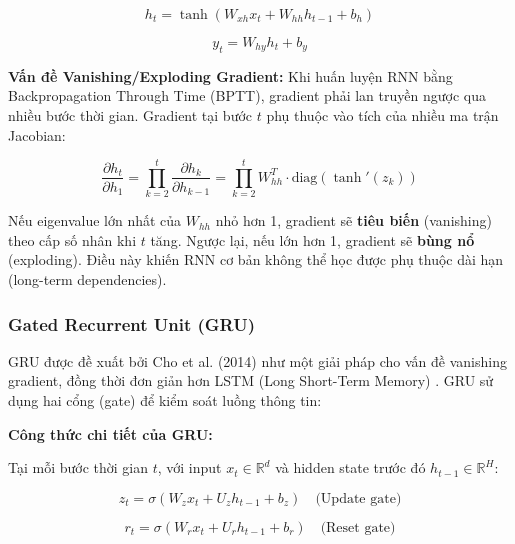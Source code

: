 \documentclass[12pt, a4paper]{article}
\begin{document}
\begin{equation}
    h_t = \tanh(W_{xh} x_t + W_{hh} h_{t-1} + b_h)
    \label{eq:rnn_basic}
\end{equation}

\begin{equation}
    y_t = W_{hy} h_t + b_y
    \label{eq:rnn_output}
\end{equation}

\textbf{Vấn đề Vanishing/Exploding Gradient:} Khi huấn luyện RNN bằng Backpropagation Through Time (BPTT), gradient phải lan truyền ngược qua nhiều bước thời gian. Gradient tại bước $t$ phụ thuộc vào tích của nhiều ma trận Jacobian:

\begin{equation}
    \frac{\partial h_t}{\partial h_1} = \prod_{k=2}^{t} \frac{\partial h_k}{\partial h_{k-1}} = \prod_{k=2}^{t} W_{hh}^T \cdot \text{diag}(\tanh'(z_k))
    \label{eq:vanishing}
\end{equation}

Nếu eigenvalue lớn nhất của $W_{hh}$ nhỏ hơn 1, gradient sẽ \textbf{tiêu biến} (vanishing) theo cấp số nhân khi $t$ tăng. Ngược lại, nếu lớn hơn 1, gradient sẽ \textbf{bùng nổ} (exploding). Điều này khiến RNN cơ bản không thể học được phụ thuộc dài hạn (long-term dependencies).

\subsubsection{Gated Recurrent Unit (GRU)}

GRU được đề xuất bởi Cho et al. (2014) \cite{cho2014} như một giải pháp cho vấn đề vanishing gradient, đồng thời đơn giản hơn LSTM (Long Short-Term Memory) \cite{hochreiter1997}. GRU sử dụng hai cổng (gate) để kiểm soát luồng thông tin:

\textbf{Công thức chi tiết của GRU:}

Tại mỗi bước thời gian $t$, với input $x_t \in \mathbb{R}^d$ và hidden state trước đó $h_{t-1} \in \mathbb{R}^H$:

\begin{equation}
\boxed{
    z_t = \sigma(W_z x_t + U_z h_{t-1} + b_z)
}
\quad \text{(Update gate)}
\label{eq:gru_update}
\end{equation}

\begin{equation}
\boxed{
    r_t = \sigma(W_r x_t + U_r h_{t-1} + b_r)
}
\quad \text{(Reset gate)}
\label{eq:gru_reset}
\end{equation}
\end{document}
